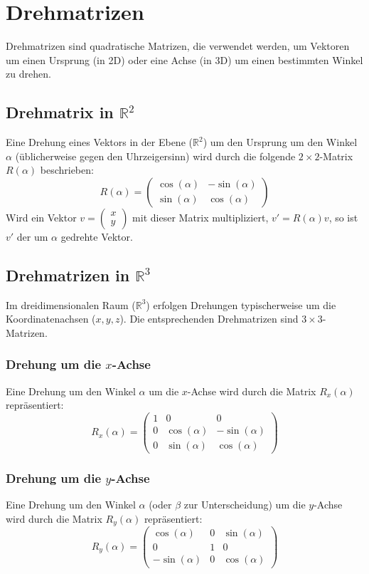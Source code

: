 \section{Drehmatrizen}

Drehmatrizen sind quadratische Matrizen, die verwendet werden, um Vektoren um
einen Ursprung (in 2D) oder eine Achse (in 3D) um einen bestimmten Winkel zu
drehen.

\subsection*{Drehmatrix in $\mathbb{R}^2$}
Eine Drehung eines Vektors in der Ebene ($\mathbb{R}^2$) um den Ursprung um den Winkel $\alpha$ (üblicherweise gegen den Uhrzeigersinn) wird durch die folgende $2 \times 2$-Matrix $R(\alpha)$ beschrieben:
\[
   R(\alpha) = \begin{pmatrix}
      \cos(\alpha) & -\sin(\alpha) \\
      \sin(\alpha) & \cos(\alpha)
   \end{pmatrix}
\]
Wird ein Vektor $v = \begin{pmatrix} x \\ y \end{pmatrix}$ mit dieser Matrix multipliziert, $v' = R(\alpha)v$, so ist $v'$ der um $\alpha$ gedrehte Vektor.

\subsection*{Drehmatrizen in $\mathbb{R}^3$}
Im dreidimensionalen Raum ($\mathbb{R}^3$) erfolgen Drehungen typischerweise um die Koordinatenachsen ($x, y, z$). Die entsprechenden Drehmatrizen sind $3 \times 3$-Matrizen.

\subsubsection*{Drehung um die $x$-Achse}
Eine Drehung um den Winkel $\alpha$ um die $x$-Achse wird durch die Matrix $R_x(\alpha)$ repräsentiert:
\[
   R_x(\alpha) = \begin{pmatrix}
      1 & 0            & 0             \\
      0 & \cos(\alpha) & -\sin(\alpha) \\
      0 & \sin(\alpha) & \cos(\alpha)
   \end{pmatrix}
\]

\subsubsection*{Drehung um die $y$-Achse}
Eine Drehung um den Winkel $\alpha$ (oder $\beta$ zur Unterscheidung) um die $y$-Achse wird durch die Matrix $R_y(\alpha)$ repräsentiert:
\[
   R_y(\alpha) = \begin{pmatrix}
      \cos(\alpha)  & 0 & \sin(\alpha) \\
      0             & 1 & 0            \\
      -\sin(\alpha) & 0 & \cos(\alpha)
   \end{pmatrix}
\]


